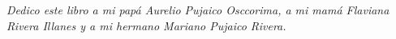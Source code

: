 \cleardoublepage

\null
\vfill
\thispagestyle{empty}



{\normalsize \it \hfill Dedico este libro 
a mi papá Aurelio Pujaico Osccorima, 
a mi mamá Flaviana Rivera Illanes
y a mi hermano Mariano Pujaico Rivera.  \vspace*{4pt}}

